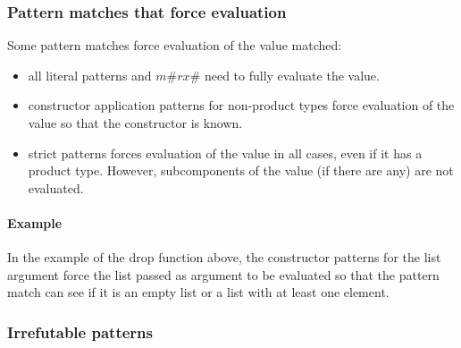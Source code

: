\subsubsection{Pattern matches that force evaluation}
Some pattern matches force evaluation of the value matched:
\begin{itemize}
\item all literal patterns and $m$\#$rx$\# need to fully evaluate the value.
\item constructor application patterns for non-product types force evaluation of the value so that the constructor is known.
\item strict patterns forces evaluation of the value in all cases, even if it has a product type. However, subcomponents of the value (if there are any) are not evaluated.
\end{itemize}

\paragraph{Example}
In the example of the drop function above, the constructor patterns for the list argument force the list passed as argument to be evaluated so that the pattern match can see if it is an empty list or a list with at least one element.

\subsubsection{Irrefutable patterns}

